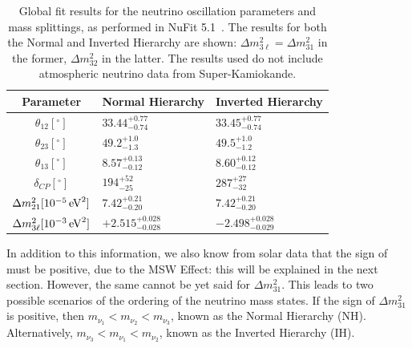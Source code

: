 \begin{table}
    \centering
    \begin{tabular}{c p{2.2cm} p{2.2cm}}
        \hline
        Parameter   & Normal Hierarchy                       & Inverted Hierarchy  \\ \hline \hline
        $\theta_{12} [^{\circ}]$ & $33.44^{+0.77}_{-0.74}$  & $33.45^{+0.77}_{-0.74}$     \\
        $\theta_{23} [^{\circ}]$ & $49.2^{+1.0}_{-1.3}$     & $49.5^{+1.0}_{-1.2}$  \\
        $\theta_{13} [^{\circ}]$ & $8.57^{+0.13}_{-0.12}$   & $8.60^{+0.12}_{-0.12}$  \\
        $\delta_{CP} [^{\circ}]$ & $194^{+52}_{-25}$        & $287^{+27}_{-32}$   \\
        $\dmsq{} [10^{-5}\,\si{eV\squared}]$ & $7.42^{+0.21}_{-0.20}$ & $7.42^{+0.21}_{-0.20}$    \\
        $\Delta m^{2}_{3\ell} [10^{-3}\,\si{eV\squared}]$ & $+2.515^{+0.028}_{-0.028}$ & $-2.498^{+0.028}_{-0.029}$    \\
        \hline
    \end{tabular}
    \caption[Global Fit neutrino oscillation parameters]
    {Global fit results for the neutrino oscillation parameters and mass splittings, as performed in NuFit 5.1~\cite{estebanFateHintsUpdated2020}. The results for both the Normal and Inverted Hierarchy are shown: $\Delta m^{2}_{3\ell} = \Delta m^{2}_{31}$ in the former, $\Delta m^{2}_{32}$ in the latter. The results used do not include atmospheric neutrino data from Super-Kamiokande.}
    \label{tab:nufit_osc_params}
\end{table}

In addition to this information, we also know from solar data that the sign of \dmsq{} must be positive, due to the MSW Effect: this will be explained in the next section. However, the same cannot be yet said for $\Delta m^{2}_{31}$. This leads to two possible scenarios of the ordering of the neutrino mass states. If the sign of $\Delta m^{2}_{31}$ is positive, then $m_{\nu_{1}}<m_{\nu_{2}}<m_{\nu_{3}}$, known as the Normal Hierarchy (NH). Alternatively, $m_{\nu_{3}}<m_{\nu_{1}}<m_{\nu_{2}}$, known as the Inverted Hierarchy (IH).


